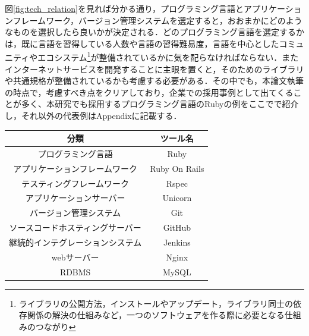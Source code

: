 図\ref{fig:tech_relation}を見れば分かる通り，プログラミング言語とアプリケーションフレームワーク，バージョン管理システムを選定すると，おおまかにどのようなものを選択したら良いかが決定される．どのプログラミング言語を選定するかは，既に言語を習得している人数や言語の習得難易度，言語を中心としたコミュニティやエコシステム\footnote{ライブラリの公開方法，インストールやアップデート，ライブラリ同士の依存関係の解決の仕組みなど，一つのソフトウェアを作る際に必要となる仕組みのつながり}が整備されているかに気を配らなければならない．またインターネットサービスを開発することに主眼を置くと，そのためのライブラリや共通規格が整備されているかも考慮する必要がある．その中でも，本論文執筆の時点で，考慮すべき点をクリアしており，企業での採用事例として出てくることが多く、本研究でも採用するプログラミング言語のRubyの例をここでで紹介し，それ以外の代表例はAppendixに記載する．

\begin{table}[ht]
  \begin{center}
    \begin{tabular}{|c|c|}
      \hline
      分類 & ツール名 \\
      \hline
      プログラミング言語 & Ruby \\
      \hline
      アプリケーションフレームワーク& Ruby On Rails\\
      \hline
      テスティングフレームワーク & Rspec \\
      \hline
      アプリケーションサーバー & Unicorn \\
      \hline
      バージョン管理システム & Git \\
      \hline
      ソースコードホスティングサーバー & GitHub \\
      \hline
      継続的インテグレーションシステム & Jenkins \\
      \hline
      webサーバー & Nginx \\
      \hline
      RDBMS & MySQL \\
      \hline
    \end{tabular}
  \end{center}
\end{table}
